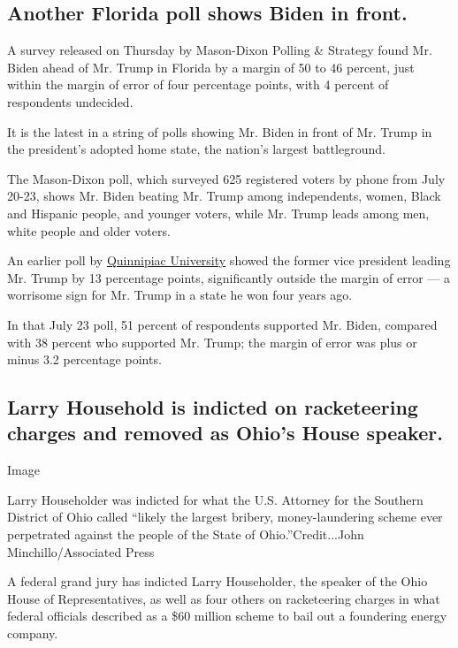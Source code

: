 \hypertarget{another-florida-poll-shows-biden-in-front}{%
\subsection{Another Florida poll shows Biden in
front.}\label{another-florida-poll-shows-biden-in-front}}

A survey released on Thursday by Mason-Dixon Polling \& Strategy found
Mr. Biden ahead of Mr. Trump in Florida by a margin of 50 to 46 percent,
just within the margin of error of four percentage points, with 4
percent of respondents undecided.

It is the latest in a string of polls showing Mr. Biden in front of Mr.
Trump in the president's adopted home state, the nation's largest
battleground.

The Mason-Dixon poll, which surveyed 625 registered voters by phone from
July 20-23, shows Mr. Biden beating Mr. Trump among independents, women,
Black and Hispanic people, and younger voters, while Mr. Trump leads
among men, white people and older voters.

An earlier poll by
\href{https://poll.qu.edu/florida/release-detail?ReleaseID=3668}{Quinnipiac
University} showed the former vice president leading Mr. Trump by 13
percentage points, significantly outside the margin of error --- a
worrisome sign for Mr. Trump in a state he won four years ago.

In that July 23 poll, 51 percent of respondents supported Mr. Biden,
compared with 38 percent who supported Mr. Trump; the margin of error
was plus or minus 3.2 percentage points.

\hypertarget{larry-household-is-indicted-on-racketeering-charges-and-removed-as-ohios-house-speaker}{%
\subsection{Larry Household is indicted on racketeering charges and
removed as Ohio's House
speaker.}\label{larry-household-is-indicted-on-racketeering-charges-and-removed-as-ohios-house-speaker}}

Image

Larry Householder was indicted for what the U.S. Attorney for the
Southern District of Ohio called ``likely the largest bribery,
money-laundering scheme ever perpetrated against the people of the State
of Ohio.''Credit...John Minchillo/Associated Press

A federal grand jury has indicted Larry Householder, the speaker of the
Ohio House of Representatives, as well as four others on racketeering
charges in what federal officials described as a \$60 million scheme to
bail out a foundering energy company.

